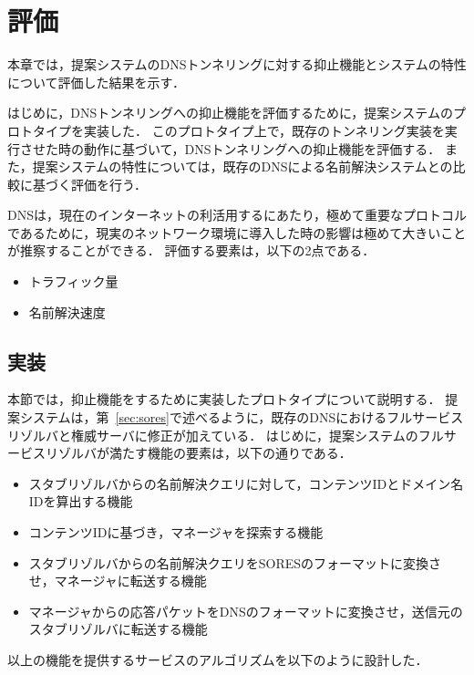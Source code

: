 \section{評価}
本章では，提案システムのDNSトンネリングに対する抑止機能とシステムの特性について評価した結果を示す．

はじめに，DNSトンネリングへの抑止機能を評価するために，提案システムのプロトタイプを実装した．
このプロトタイプ上で，既存のトンネリング実装を実行させた時の動作に基づいて，DNSトンネリングへの抑止機能を評価する．
また，提案システムの特性については，既存のDNSによる名前解決システムとの比較に基づく評価を行う．

DNSは，現在のインターネットの利活用するにあたり，極めて重要なプロトコルであるために，現実のネットワーク環境に導入した時の影響は極めて大きいことが推察することができる．
評価する要素は，以下の2点である．
\begin{itemize}
 \item トラフィック量
 \item 名前解決速度
\end{itemize}

\subsection{実装}
本節では，抑止機能をするために実装したプロトタイプについて説明する．
提案システムは，第~\ref{sec:sores}で述べるように，既存のDNSにおけるフルサービスリゾルバと権威サーバに修正が加えている．
はじめに，提案システムのフルサービスリゾルバが満たす機能の要素は，以下の通りである．
\begin{itemize}
 \item スタブリゾルバからの名前解決クエリに対して，コンテンツIDとドメイン名IDを算出する機能
 \item コンテンツIDに基づき，マネージャを探索する機能
 \item スタブリゾルバからの名前解決クエリをSORESのフォーマットに変換させ，マネージャに転送する機能
 \item マネージャからの応答パケットをDNSのフォーマットに変換させ，送信元のスタブリゾルバに転送する機能
\end{itemize}

以上の機能を提供するサービスのアルゴリズムを以下のように設計した．







